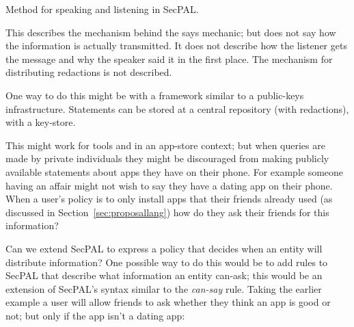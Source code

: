 \documentclass[a4paper]{article}
\begin{document}
\begin{marginfigure}
  \begin{algorithm}[H]
    \;

  \end{algorithm}
  \caption{Method for speaking and listening in SecPAL.}
  \label{alg:speaking}
\end{marginfigure}

This describes the mechanism behind the says mechanic; but does not say how the
information is actually transmitted.  It does not describe how the listener gets
the message and why the speaker said it in the first place.
The mechanism for distributing redactions is not described. 

One way to do this
might be with a framework similar to a public-keys infrastructure.
Statements can be stored at a central repository (with redactions), with a
key-store.  

This might work for tools and in an app-store context; but when queries are made
by private individuals they might be discouraged from making publicly available
statements about apps they have on their phone.  For example someone having an
affair might not wish to say they have a dating app on their phone.  When a
user's policy is to only install apps that their friends already used (as
discussed in Section~\ref{sec:proposallang}) how do they ask their friends for
this information?  

Can we extend SecPAL to express a policy that decides when an
entity will distribute information?
One possible way to do this would be to add rules to SecPAL that describe what
information an entity can-ask; this would be an extension of SecPAL's syntax
similar to the \emph{can-say} rule.  Taking the earlier example a user will allow
friends to ask whether they think an app is good or not; but only if the app
isn't a dating app:
\end{document}
